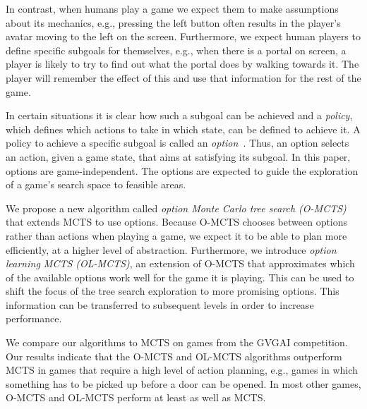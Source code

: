 In contrast, when humans play a game we expect them to make assumptions about
its mechanics, e.g., pressing the left button often results in the player's
avatar moving to the left on the screen.  Furthermore, we expect human players
to define specific subgoals for themselves, e.g., when there is a portal on
screen, a player is likely to try to find out what the portal does by walking
towards it.  The player will remember the effect of this and use that
information for the rest of the game.

In certain situations it is clear how such a subgoal can be achieved and a
\emph{policy}, which defines which actions to take in which state, can be
defined to achieve it. A policy to achieve a specific subgoal is called an
\emph{option}~\cite{sutton1999between}.  Thus, an option selects an action,
given a game state, that aims at satisfying its subgoal. In this paper, options
are game-independent. The options are expected to guide the exploration of a
game's search space to feasible areas.


We propose a new algorithm called \emph{option Monte Carlo tree search (O-MCTS)}
that extends MCTS to use options. Because O-MCTS chooses between options rather
than actions when playing a game, we expect it to be able to plan more
efficiently, at a higher level of abstraction. Furthermore, we introduce
\emph{option learning MCTS (OL-MCTS)}, an extension of O-MCTS that approximates
which of the available options work well for the game it is playing. This
can be used to shift the focus of the tree search exploration to more promising
options. This information can be transferred to subsequent levels in order to
increase performance.

We compare our algorithms to MCTS on games from the GVGAI competition. Our
results indicate that the O-MCTS and OL-MCTS algorithms outperform MCTS in games
that require a high level of action planning, e.g., games in which something has
to be picked up before a door can be opened. In most other games, O-MCTS and
OL-MCTS perform at least as well as MCTS\@.
